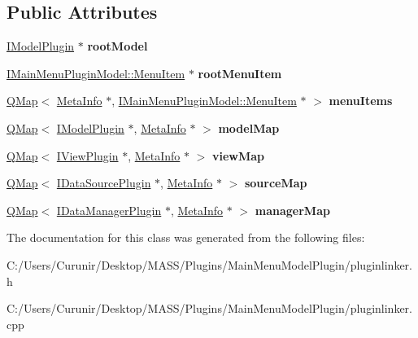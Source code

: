 \subsection*{Public Attributes}
\begin{DoxyCompactItemize}
\item 
\mbox{\label{class_plugin_linker_ab1ecde85d4d754ee95f8c52e3eddc265}} 
\hyperlink{class_i_model_plugin}{I\+Model\+Plugin} $\ast$ {\bfseries root\+Model}
\item 
\mbox{\label{class_plugin_linker_a44b3d50d05723673e3682a9987621ee3}} 
\hyperlink{struct_i_main_menu_plugin_model_1_1_menu_item}{I\+Main\+Menu\+Plugin\+Model\+::\+Menu\+Item} $\ast$ {\bfseries root\+Menu\+Item}
\item 
\mbox{\label{class_plugin_linker_aebd5426ad88d05de6dc358c2697e143f}} 
\hyperlink{class_q_map}{Q\+Map}$<$ \hyperlink{struct_meta_info}{Meta\+Info} $\ast$, \hyperlink{struct_i_main_menu_plugin_model_1_1_menu_item}{I\+Main\+Menu\+Plugin\+Model\+::\+Menu\+Item} $\ast$ $>$ {\bfseries menu\+Items}
\item 
\mbox{\label{class_plugin_linker_adb1fa516735cef59600dbe5777499841}} 
\hyperlink{class_q_map}{Q\+Map}$<$ \hyperlink{class_i_model_plugin}{I\+Model\+Plugin} $\ast$, \hyperlink{struct_meta_info}{Meta\+Info} $\ast$ $>$ {\bfseries model\+Map}
\item 
\mbox{\label{class_plugin_linker_a9703ef182dce1dcb24e83110d98933f1}} 
\hyperlink{class_q_map}{Q\+Map}$<$ \hyperlink{class_i_view_plugin}{I\+View\+Plugin} $\ast$, \hyperlink{struct_meta_info}{Meta\+Info} $\ast$ $>$ {\bfseries view\+Map}
\item 
\mbox{\label{class_plugin_linker_a452d0698f6ea36e83c8094444bdfd59f}} 
\hyperlink{class_q_map}{Q\+Map}$<$ \hyperlink{class_i_data_source_plugin}{I\+Data\+Source\+Plugin} $\ast$, \hyperlink{struct_meta_info}{Meta\+Info} $\ast$ $>$ {\bfseries source\+Map}
\item 
\mbox{\label{class_plugin_linker_af19a364f23b397652828ce411c48e414}} 
\hyperlink{class_q_map}{Q\+Map}$<$ \hyperlink{class_i_data_manager_plugin}{I\+Data\+Manager\+Plugin} $\ast$, \hyperlink{struct_meta_info}{Meta\+Info} $\ast$ $>$ {\bfseries manager\+Map}
\end{DoxyCompactItemize}


The documentation for this class was generated from the following files\+:\begin{DoxyCompactItemize}
\item 
C\+:/\+Users/\+Curunir/\+Desktop/\+M\+A\+S\+S/\+Plugins/\+Main\+Menu\+Model\+Plugin/pluginlinker.\+h\item 
C\+:/\+Users/\+Curunir/\+Desktop/\+M\+A\+S\+S/\+Plugins/\+Main\+Menu\+Model\+Plugin/pluginlinker.\+cpp\end{DoxyCompactItemize}
